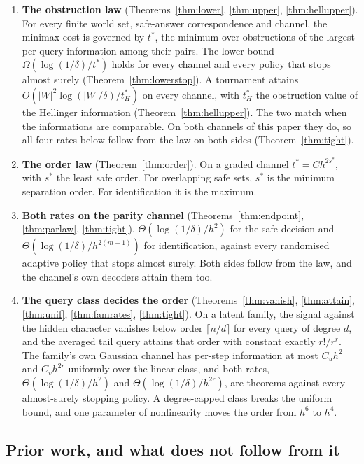 \begin{enumerate}
\item[1)] \textbf{The obstruction law} (Theorems~\ref{thm:lower}, \ref{thm:upper},
\ref{thm:hellupper}). For every
finite world set, safe-answer correspondence and channel, the minimax cost is governed by
$t^{*}$, the minimum over obstructions of the largest per-query information among their pairs.
The lower bound $\Omega(\log(1/\delta)/t^{*})$ holds for every channel and every policy that
stops almost surely (Theorem~\ref{thm:lowerstop}). A
tournament attains $O(|W|^{2}\log(|W|/\delta)/t^{*}_{H})$ on every channel, with $t^{*}_{H}$ the
obstruction value of the Hellinger information (Theorem~\ref{thm:hellupper}). The two match
when the informations are comparable. On both channels of this paper they do, so all four
rates below follow from the law on both sides (Theorem~\ref{thm:tight}).
\item[2)] \textbf{The order law} (Theorem~\ref{thm:order}). On a graded channel $t^{*}=Ch^{2s^{*}}$,
with $s^{*}$ the least safe order. For overlapping safe sets, $s^{*}$ is the minimum
separation order. For identification it is the maximum.
\item[3)] \textbf{Both rates on the parity channel} (Theorems~\ref{thm:endpoint},
\ref{thm:parlaw}, \ref{thm:tight}). $\Theta(\log(1/\delta)/h^{2})$ for the safe decision and
$\Theta(\log(1/\delta)/h^{2(m-1)})$ for identification, against every randomised adaptive policy
that stops almost surely. Both sides follow from the law, and the channel's own decoders attain
them too.
\item[4)] \textbf{The query class decides the order} (Theorems~\ref{thm:vanish},
\ref{thm:attain}, \ref{thm:unif}, \ref{thm:famrates}, \ref{thm:tight}). On a latent family, the signal against
the hidden character vanishes below order $\lceil n/d\rceil$ for every query of degree $d$, and
the averaged tail query attains that order with constant exactly $r!/r^{r}$. The family's own
Gaussian channel has per-step information at most $C_{u}h^{2}$ and $C_{v}h^{2r}$ uniformly over
the linear class, and both rates, $\Theta(\log(1/\delta)/h^{2})$ and
$\Theta(\log(1/\delta)/h^{2r})$, are theorems against every almost-surely stopping policy. A
degree-capped class breaks the uniform bound, and one parameter of nonlinearity moves the order
from $h^{6}$ to $h^{4}$.
\end{enumerate}

\subsection{Prior work, and what does not follow from it}

